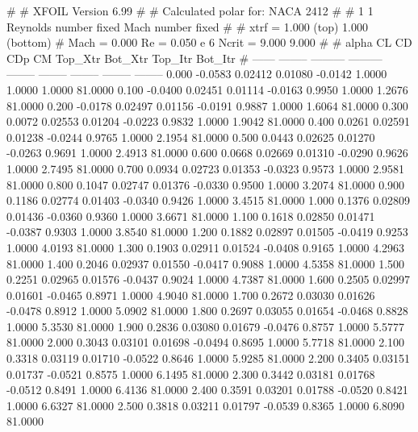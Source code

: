 #  
#       XFOIL         Version 6.99
#  
# Calculated polar for: NACA 2412                                       
#  
# 1 1 Reynolds number fixed          Mach number fixed         
#  
# xtrf =   1.000 (top)        1.000 (bottom)  
# Mach =   0.000     Re =     0.050 e 6     Ncrit =   9.000  9.000
#  
#   alpha    CL        CD       CDp       CM     Top_Xtr  Bot_Xtr  Top_Itr  Bot_Itr
#  ------ -------- --------- --------- -------- -------- -------- -------- --------
   0.000  -0.0583   0.02412   0.01080  -0.0142   1.0000   1.0000   1.0000  81.0000
   0.100  -0.0400   0.02451   0.01114  -0.0163   0.9950   1.0000   1.2676  81.0000
   0.200  -0.0178   0.02497   0.01156  -0.0191   0.9887   1.0000   1.6064  81.0000
   0.300   0.0072   0.02553   0.01204  -0.0223   0.9832   1.0000   1.9042  81.0000
   0.400   0.0261   0.02591   0.01238  -0.0244   0.9765   1.0000   2.1954  81.0000
   0.500   0.0443   0.02625   0.01270  -0.0263   0.9691   1.0000   2.4913  81.0000
   0.600   0.0668   0.02669   0.01310  -0.0290   0.9626   1.0000   2.7495  81.0000
   0.700   0.0934   0.02723   0.01353  -0.0323   0.9573   1.0000   2.9581  81.0000
   0.800   0.1047   0.02747   0.01376  -0.0330   0.9500   1.0000   3.2074  81.0000
   0.900   0.1186   0.02774   0.01403  -0.0340   0.9426   1.0000   3.4515  81.0000
   1.000   0.1376   0.02809   0.01436  -0.0360   0.9360   1.0000   3.6671  81.0000
   1.100   0.1618   0.02850   0.01471  -0.0387   0.9303   1.0000   3.8540  81.0000
   1.200   0.1882   0.02897   0.01505  -0.0419   0.9253   1.0000   4.0193  81.0000
   1.300   0.1903   0.02911   0.01524  -0.0408   0.9165   1.0000   4.2963  81.0000
   1.400   0.2046   0.02937   0.01550  -0.0417   0.9088   1.0000   4.5358  81.0000
   1.500   0.2251   0.02965   0.01576  -0.0437   0.9024   1.0000   4.7387  81.0000
   1.600   0.2505   0.02997   0.01601  -0.0465   0.8971   1.0000   4.9040  81.0000
   1.700   0.2672   0.03030   0.01626  -0.0478   0.8912   1.0000   5.0902  81.0000
   1.800   0.2697   0.03055   0.01654  -0.0468   0.8828   1.0000   5.3530  81.0000
   1.900   0.2836   0.03080   0.01679  -0.0476   0.8757   1.0000   5.5777  81.0000
   2.000   0.3043   0.03101   0.01698  -0.0494   0.8695   1.0000   5.7718  81.0000
   2.100   0.3318   0.03119   0.01710  -0.0522   0.8646   1.0000   5.9285  81.0000
   2.200   0.3405   0.03151   0.01737  -0.0521   0.8575   1.0000   6.1495  81.0000
   2.300   0.3442   0.03181   0.01768  -0.0512   0.8491   1.0000   6.4136  81.0000
   2.400   0.3591   0.03201   0.01788  -0.0520   0.8421   1.0000   6.6327  81.0000
   2.500   0.3818   0.03211   0.01797  -0.0539   0.8365   1.0000   6.8090  81.0000

